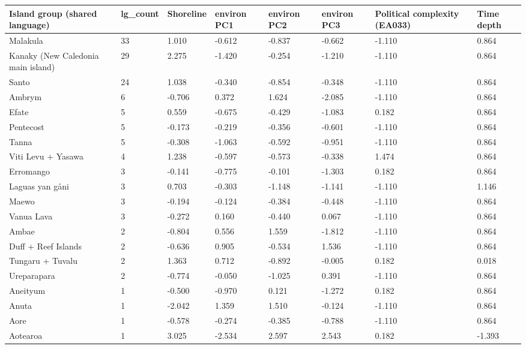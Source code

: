 \begin{longtable}{p{4.5cm}p{1.4cm}p{1.4cm}p{1.4cm}p{1.7cm}p{1.7cm}p{1.7cm}p{1.7cm}}
  \toprule
Island group (shared language) & lg_count & Shoreline & environ PC1 & environ PC2 & environ PC3 & Political complexity (EA033) & Time depth \\ 
  \midrule
Malakula & 33 & 1.010 & -0.612 & -0.837 & -0.662 & -1.110 & 0.864 \\ 
  Kanaky (New Caledonia main island) & 29 & 2.275 & -1.420 & -0.254 & -1.210 & -1.110 & 0.864 \\ 
  Santo & 24 & 1.038 & -0.340 & -0.854 & -0.348 & -1.110 & 0.864 \\ 
  Ambrym & 6 & -0.706 & 0.372 & 1.624 & -2.085 & -1.110 & 0.864 \\ 
  Efate & 5 & 0.559 & -0.675 & -0.429 & -1.083 & 0.182 & 0.864 \\ 
  Pentecost & 5 & -0.173 & -0.219 & -0.356 & -0.601 & -1.110 & 0.864 \\ 
  Tanna & 5 & -0.308 & -1.063 & -0.592 & -0.951 & -1.110 & 0.864 \\ 
  Viti Levu + Yasawa & 4 & 1.238 & -0.597 & -0.573 & -0.338 & 1.474 & 0.864 \\ 
  Erromango & 3 & -0.141 & -0.775 & -0.101 & -1.303 & 0.182 & 0.864 \\ 
  Laguas yan gåni & 3 & 0.703 & -0.303 & -1.148 & -1.141 & -1.110 & 1.146 \\ 
  Maewo & 3 & -0.194 & -0.124 & -0.384 & -0.448 & -1.110 & 0.864 \\ 
  Vanua Lava & 3 & -0.272 & 0.160 & -0.440 & 0.067 & -1.110 & 0.864 \\ 
  Ambae & 2 & -0.804 & 0.556 & 1.559 & -1.812 & -1.110 & 0.864 \\ 
  Duff + Reef Islands & 2 & -0.636 & 0.905 & -0.534 & 1.536 & -1.110 & 0.864 \\ 
  Tungaru + Tuvalu & 2 & 1.363 & 0.712 & -0.892 & -0.005 & 0.182 & 0.018 \\ 
  Ureparapara & 2 & -0.774 & -0.050 & -1.025 & 0.391 & -1.110 & 0.864 \\ 
  Aneityum & 1 & -0.500 & -0.970 & 0.121 & -1.272 & 0.182 & 0.864 \\ 
  Anuta & 1 & -2.042 & 1.359 & 1.510 & -0.124 & -1.110 & 0.864 \\ 
  Aore & 1 & -0.578 & -0.274 & -0.385 & -0.788 & -1.110 & 0.864 \\ 
  Aotearoa & 1 & 3.025 & -2.534 & 2.597 & 2.543 & 0.182 & -1.393 \\ 

\end{longtable}
